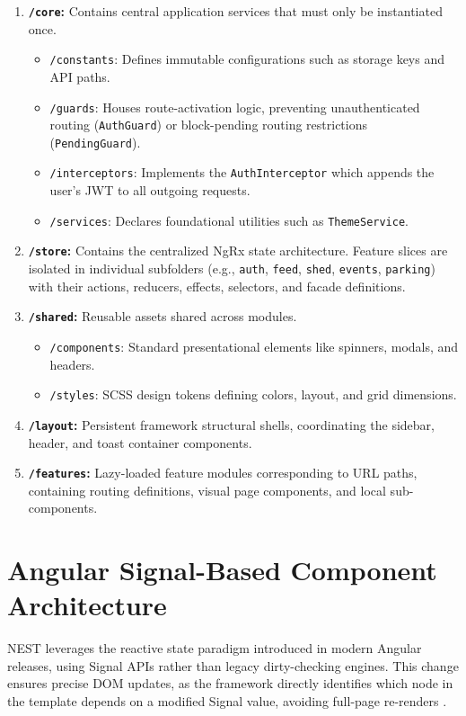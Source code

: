 \begin{enumerate}
    \item \textbf{\texttt{/core}:} Contains central application services that must only be instantiated once.
    \begin{itemize}
        \item \texttt{/constants}: Defines immutable configurations such as storage keys and API paths.
        \item \texttt{/guards}: Houses route-activation logic, preventing unauthenticated routing (\texttt{AuthGuard}) or block-pending routing restrictions (\texttt{PendingGuard}).
        \item \texttt{/interceptors}: Implements the \texttt{AuthInterceptor} which appends the user's JWT to all outgoing requests.
        \item \texttt{/services}: Declares foundational utilities such as \texttt{ThemeService}.
    \end{itemize}
    \item \textbf{\texttt{/store}:} Contains the centralized NgRx state architecture. Feature slices are isolated in individual subfolders (e.g., \texttt{auth}, \texttt{feed}, \texttt{shed}, \texttt{events}, \texttt{parking}) with their actions, reducers, effects, selectors, and facade definitions.
    \item \textbf{\texttt{/shared}:} Reusable assets shared across modules.
    \begin{itemize}
        \item \texttt{/components}: Standard presentational elements like spinners, modals, and headers.
        \item \texttt{/styles}: SCSS design tokens defining colors, layout, and grid dimensions.
    \end{itemize}
    \item \textbf{\texttt{/layout}:} Persistent framework structural shells, coordinating the sidebar, header, and toast container components.
    \item \textbf{\texttt{/features}:} Lazy-loaded feature modules corresponding to URL paths, containing routing definitions, visual page components, and local sub-components.
\end{enumerate}

\section{Angular Signal-Based Component Architecture}
NEST leverages the reactive state paradigm introduced in modern Angular releases, using Signal APIs rather than legacy dirty-checking engines. This change ensures precise DOM updates, as the framework directly identifies which node in the template depends on a modified Signal value, avoiding full-page re-renders \cite{angularSignalsRfc}.

